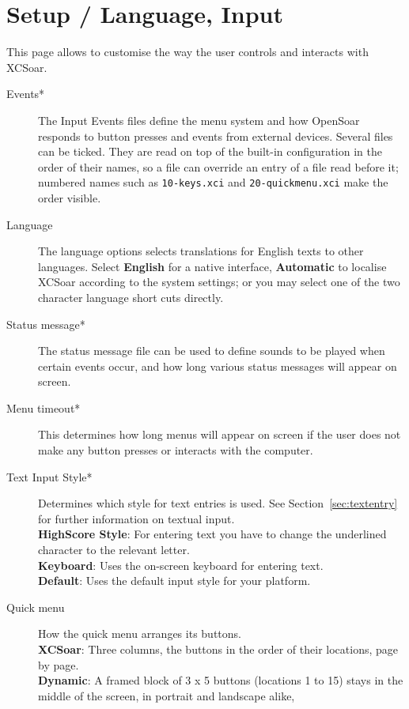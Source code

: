 \section{Setup / Language, Input}\label{sec:interface}

This page allows to customise the way the user controls and interacts with
XCSoar.

\begin{description}
\item[Events*]  The Input Events files define the menu system and how
  OpenSoar responds to button presses and events from external devices.
  Several files can be ticked.  They are read on top of the built-in
  configuration in the order of their names, so a file can override an
  entry of a file read before it; numbered names such as
  \texttt{10-keys.xci} and \texttt{20-quickmenu.xci} make the order
  visible.
\item[Language]  The language options selects translations for English texts to
  other languages.  Select {\bf English} for a native interface, {\bf Automatic}
  to localise XCSoar according to the system settings; or you may select one of 
  the two character language short cuts directly.
\item[Status message*]  The status message file can be used to define sounds to 
  be played when certain events occur, and how long various status messages will 
  appear on screen.
\item[Menu timeout*]  This determines how long menus will appear on screen if the user
  does not make any button presses or interacts with the computer.
\item[Text Input Style*]  Determines which style for text entries is used. 
  See Section~\ref{sec:textentry} for further information on textual input. \\
  {\bf HighScore Style}: For entering text you have to change the underlined 
  character to the relevant letter. \\
  {\bf Keyboard}: Uses the on-screen keyboard for entering text. \\
  {\bf Default}: Uses the default input style for your platform.
\item[Quick menu]  How the quick menu arranges its buttons. \\
  {\bf XCSoar}: Three columns, the buttons in the order of their
  locations, page by page. \\
  {\bf Dynamic}: A framed block of 3 x 5 buttons (locations 1 to 15)
  stays in the middle of the screen, in portrait and landscape alike,

\end{description}
